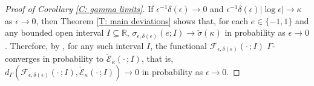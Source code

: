 \documentclass[12pt]{amsart}
\begin{document}
\begin{proof}[Proof of Corollary \ref{C: gamma limits}] If $\epsilon^{-1} \delta(\epsilon) \to 0$ and $\epsilon^{-1} \delta(\epsilon) |\log \epsilon| \to \kappa$ as $\epsilon \to 0$, then Theorem \ref{T: main deviations} shows that, for each $e \in \{-1,1\}$ and any bounded open interval $I \subseteq \mathbb{R}$,  $\sigma_{\epsilon,\delta(\epsilon)}(e;I) \to \check{\sigma}(\kappa)$ in probability as $\epsilon \to 0$. Therefore, by \cite[Theorem 4]{part1}, for any such interval $I$, the functional $\mathscr{F}_{\epsilon,\delta(\epsilon)}(\cdot \, ;I)$ $\Gamma$-converges in probability to $\check{\mathscr{E}}_{\kappa}(\cdot \, ;I)$, that is, $d_{\Gamma} ( \mathscr{F}_{\epsilon,\delta(\epsilon)}(\cdot \,;I), \check{\mathscr{E}}_{\kappa}(\cdot \,;I)) \to 0$ in probability as $\epsilon \to 0$.\end{proof}
\end{document}
